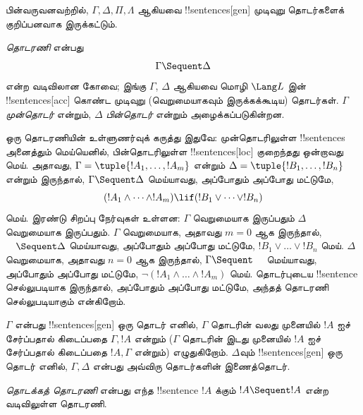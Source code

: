 \documentclass[../../../include/open-logic-section]{subfiles}
\begin{document}
      {}
      {}


பின்வருவனவற்றில், $\Gamma, \Delta, \Pi, \Lambda$ ஆகியவை
!!{sentence}s[gen] முடிவுறு தொடர்களைக் குறிப்பனவாக இருக்கட்டும்.

\begin{defn}[தொடரணி]
\emph{தொடரணி} என்பது
\[
\Gamma \Sequent \Delta
\]
என்ற வடிவிலான கோவை; இங்கு $\Gamma$, $\Delta$ ஆகியவை மொழி $\Lang L$ இன்
!!{sentence}s[acc] கொண்ட முடிவுறு (வெறுமையாகவும் இருக்கக்கூடிய) தொடர்கள்.
$\Gamma$ \emph{முன்தொடர்} என்றும், $\Delta$ \emph{பின்தொடர்} என்றும்
அழைக்கப்படுகின்றன.
\end{defn}

\begin{explain}
ஒரு தொடரணியின் உள்ளுணர்வுக் கருத்து இதுவே: முன்தொடரிலுள்ள !!{sentence}s
அனைத்தும் மெய்யெனில், பின்தொடரிலுள்ள !!{sentence}s[loc] குறைந்தது ஒன்றாவது
மெய். அதாவது, $\Gamma = \tuple{!A_1, \dots, !A_m}$ என்றும்
$\Delta = \tuple{!B_1, \dots, !B_n}$ என்றும் இருந்தால், $\Gamma \Sequent
\Delta$ மெய்யாவது, அப்போதும் அப்போது மட்டுமே,
\[
(!A_1 \land \cdots \land !A_m) \lif (!B_1 \lor \cdots \lor
!B_n)
\]
மெய். இரண்டு சிறப்பு நேர்வுகள் உள்ளன: $\Gamma$ வெறுமையாக இருப்பதும்
$\Delta$ வெறுமையாக இருப்பதும். $\Gamma$ வெறுமையாக, அதாவது $m = 0$ ஆக
இருந்தால், $\quad \Sequent \Delta$ மெய்யாவது, அப்போதும் அப்போது மட்டுமே,
$!B_1 \lor \dots \lor !B_n$ மெய். $\Delta$ வெறுமையாக, அதாவது $n = 0$
ஆக இருந்தால், $\Gamma \Sequent \quad$ மெய்யாவது, அப்போதும் அப்போது மட்டுமே,
$\lnot(!A_1 \land \dots \land !A_m)$ மெய். தொடர்புடைய !!{sentence}
செல்லுபடியாக இருந்தால், அப்போதும் அப்போது மட்டுமே, அந்தத் தொடரணி
செல்லுபடியாகும் என்கிறோம்.
\end{explain}

$\Gamma$ என்பது !!{sentence}s[gen] ஒரு தொடர் எனில், $\Gamma$ தொடரின் வலது முனையில்
$!A$ ஐச் சேர்ப்பதால் கிடைப்பதை $\Gamma, !A$ என்றும் ($\Gamma$ தொடரின் இடது முனையில் $!A$
ஐச் சேர்ப்பதால் கிடைப்பதை $!A, \Gamma$ என்றும்) எழுதுகிறோம். $\Delta$வும்
!!{sentence}s[gen] ஒரு தொடர் எனில், $\Gamma, \Delta$ என்பது அவ்விரு
தொடர்களின் இணைத்தொடர்.

\begin{defn}[தொடக்கத் தொடரணி]
\emph{தொடக்கத் தொடரணி} என்பது எந்த !!{sentence} $!A$ க்கும்
{$!A \Sequent !A$ என்ற வடிவிலுள்ள தொடரணி}.
\end{defn}
\end{document}

